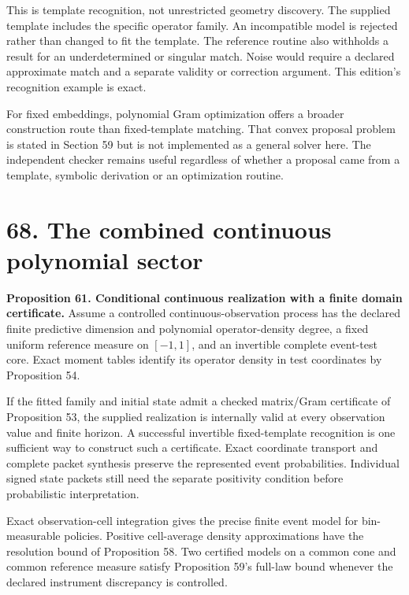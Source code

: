 \documentclass[11pt,letterpaper]{article}
\begin{document}
This is template recognition, not unrestricted geometry discovery. The
supplied template includes the specific operator family. An incompatible
model is rejected rather than changed to fit the template. The reference
routine also withholds a result for an underdetermined or singular
match. Noise would require a declared approximate match and a separate
validity or correction argument. This edition's recognition example is
exact.

For fixed embeddings, polynomial Gram optimization offers a broader
construction route than fixed-template matching. That convex proposal
problem is stated in Section 59 but is not implemented as a general
solver here. The independent checker remains useful regardless of
whether a proposal came from a template, symbolic derivation or an
optimization routine.

\section{68. The combined continuous polynomial
sector}\label{the-combined-continuous-polynomial-sector}

\textbf{Proposition 61. Conditional continuous realization with a finite
domain certificate.} Assume a controlled continuous-observation process
has the declared finite predictive dimension and polynomial
operator-density degree, a fixed uniform reference measure on
\([-1,1]\), and an invertible complete event-test core. Exact moment
tables identify its operator density in test coordinates by Proposition
54.

If the fitted family and initial state admit a checked matrix/Gram
certificate of Proposition 53, the supplied realization is internally
valid at every observation value and finite horizon. A successful
invertible fixed-template recognition is one sufficient way to construct
such a certificate. Exact coordinate transport and complete packet
synthesis preserve the represented event probabilities. Individual
signed state packets still need the separate positivity condition before
probabilistic interpretation.

Exact observation-cell integration gives the precise finite event model
for bin-measurable policies. Positive cell-average density
approximations have the resolution bound of Proposition 58. Two
certified models on a common cone and common reference measure satisfy
Proposition 59's full-law bound whenever the declared instrument
discrepancy is controlled.
\end{document}

